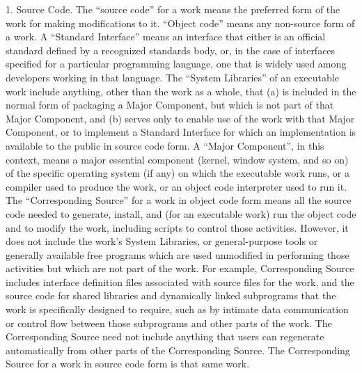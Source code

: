 \documentclass {book}
\begin{document}
\begin{tiny}
1. Source Code. The ``source code'' for a work means the preferred form of the work for making modifications to it. ``Object code'' means any non-source form of a work. A ``Standard Interface'' means an interface that either is an official standard defined by a recognized standards body, or, in the case of interfaces specified for a particular programming language, one that is widely used among developers working in that language. The ``System Libraries'' of an executable work include anything, other than the work as a whole, that (a) is included in the normal form of packaging a Major Component, but which is not part of that Major Component, and (b) serves only to enable use of the work with that Major Component, or to implement a Standard Interface for which an implementation is available to the public in source code form. A ``Major Component'', in this context, means a major essential component (kernel, window system, and so on) of the specific operating system (if any) on which the executable work runs, or a compiler used to produce the work, or an object code interpreter used to run it. The ``Corresponding Source'' for a work in object code form means all the source code needed to generate, install, and (for an executable work) run the object code and to modify the work, including scripts to control those activities. However, it does not include the work's System Libraries, or general-purpose tools or generally available free programs which are used unmodified in performing those activities but which are not part of the work. For example, Corresponding Source includes interface definition files associated with source files for the work, and the source code for shared libraries and dynamically linked subprograms that the work is specifically designed to require, such as by intimate data communication or control flow between those subprograms and other parts of the work. The Corresponding Source need not include anything that users can regenerate automatically from other parts of the Corresponding Source. The Corresponding Source for a work in source code form is that same work.


\end{tiny}
\end{document}
